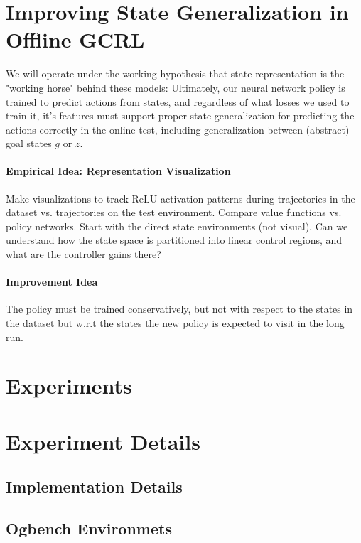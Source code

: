 \documentclass{article}
\theoremstyle{plain}
\theoremstyle{definition}
\theoremstyle{remark}
\begin{document}
\section{Improving State Generalization in Offline GCRL}

We will operate under the working hypothesis that state representation is the "working horse" behind these models: Ultimately, our neural network policy is trained to predict actions from states, and regardless of what losses we used to train it, it's features must support proper state generalization for predicting the actions correctly in the online test, including generalization between (abstract) goal states $g$ or $z$.

\paragraph{Empirical Idea: Representation Visualization} Make visualizations to track ReLU activation patterns during trajectories in the dataset vs. trajectories on the test environment. Compare value functions vs. policy networks. Start with the direct state environments (not visual). Can we understand how the state space is partitioned into linear control regions, and what are the controller gains there?

\paragraph{Improvement Idea} The policy must be trained conservatively, but not with respect to the states in the dataset but w.r.t the states the new policy is expected to visit in the long run.


\section{Experiments}
\label{sec:experiments}




\appendix

\section{Experiment Details}
\subsection{Implementation Details}
\subsection{Ogbench Environmets}
\end{document}
